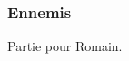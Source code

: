 \documentclass[a4paper]{article}
\begin{document}
\subsubsection{Ennemis}
Partie pour Romain.

%

%

\end{document}

